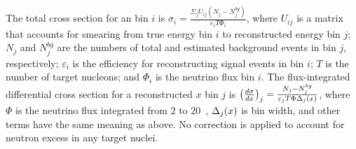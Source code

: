 
The total cross section for an \Enu bin $i$ is 
$\sigma_{i} = \frac{\Sigma_j U_{ij}(N_j-N_j^{bg})}{\varepsilon_i T \Phi_{i}} $,
where $U_{ij}$ is a matrix that accounts for smearing from true energy bin $i$ to reconstructed
energy bin $j$; $N_{j}$ and $N_{j}^{bg}$ are the numbers of total
and estimated background events in bin $j$, respectively;
$\varepsilon_{i}$ is the efficiency for reconstructing signal events in bin $i$;
$T$ is the number of target nucleons; and $\Phi_{i}$ is the neutrino flux bin $i$.
The flux-integrated differential cross section for a reconstructed $x$ bin $j$ is 
$\left(\frac{d\sigma}{dx}\right)_{j} = \frac{N_{j}-N_{j}^{bg}}{\varepsilon_{j} T \Phi \Delta_{j}(x)}$, 
where $\Phi$ is the neutrino flux integrated from $2$ to $20$~\GeV, $\Delta_{j}(x)$ is bin width, 
and other terms have the same meaning as above.
No correction is applied to account for neutron excess in any target nuclei.

